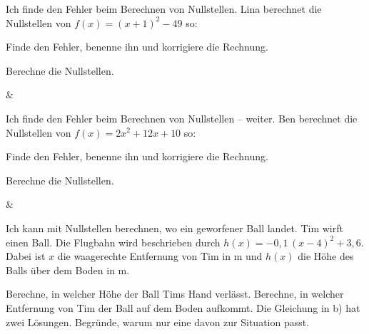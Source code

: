 \begin{aufgabe}{Ich finde den Fehler beim Berechnen von Nullstellen. Lina berechnet die Nullstellen von $f(x) = (x + 1)^2 - 49$ so:}
\begin{teile}
\teil Finde den Fehler, benenne ihn und korrigiere die Rechnung.
\end{teile}
Berechne die Nullstellen.
\begin{gleichungsraster}[4]
 & \\
\end{gleichungsraster}
\end{aufgabe}

\begin{aufgabe}{Ich finde den Fehler beim Berechnen von Nullstellen – weiter. Ben berechnet die Nullstellen von $f(x) = 2x^2 + 12x + 10$ so:}
\begin{teile}
\teil Finde den Fehler, benenne ihn und korrigiere die Rechnung.
\end{teile}
Berechne die Nullstellen.
\begin{gleichungsraster}[5]
 & \\
\end{gleichungsraster}
\end{aufgabe}

\begin{aufgabe}{Ich kann mit Nullstellen berechnen, wo ein geworfener Ball landet. Tim wirft einen Ball. Die Flugbahn wird beschrieben durch $h(x) = -0{,}1\,(x - 4)^2 + 3{,}6$. Dabei ist $x$ die waagerechte Entfernung von Tim in m und $h(x)$ die Höhe des Balls über dem Boden in m.}
\begin{teile}
\teil Berechne, in welcher Höhe der Ball Tims Hand verlässt.
\teil Berechne, in welcher Entfernung von Tim der Ball auf dem Boden aufkommt.
\teil Die Gleichung in b) hat zwei Lösungen. Begründe, warum nur eine davon zur Situation passt.
\end{teile}
\end{aufgabe}
